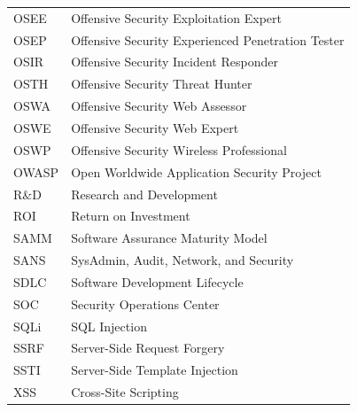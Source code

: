\documentclass[11pt,letterpaper]{article}
\begin{document}
\begin{longtable}{l l}
OSEE & Offensive Security Exploitation Expert \\
OSEP & Offensive Security Experienced Penetration Tester \\
OSIR & Offensive Security Incident Responder \\
OSTH & Offensive Security Threat Hunter \\
OSWA & Offensive Security Web Assessor \\
OSWE & Offensive Security Web Expert \\
OSWP & Offensive Security Wireless Professional \\
OWASP & Open Worldwide Application Security Project \\
R\&D & Research and Development \\
ROI & Return on Investment \\
SAMM & Software Assurance Maturity Model \\
SANS & SysAdmin, Audit, Network, and Security \\
SDLC & Software Development Lifecycle \\
SOC & Security Operations Center \\
SQLi & SQL Injection \\
SSRF & Server-Side Request Forgery \\
SSTI & Server-Side Template Injection \\
XSS & Cross-Site Scripting \\
\end{longtable}

\end{document}
